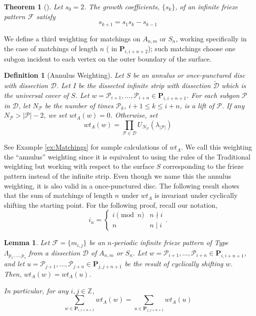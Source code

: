\documentclass[12pt]{article}
\newtheorem{definition}{Definition}
\newtheorem{theorem}{Theorem}
\newtheorem{lemma}{Lemma}
\theoremstyle{remark}
\newcommand*{\pathset}[2]{\mathbf{P}_{#1,#2}}
\newcommand*{\poly}[1]{\mathcal{P}_{#1}}
\newcommand*{\F}{\mathcal{F}}
\newcommand*{\D}{\mathcal{D}}
\begin{document}
\begin{theorem}[\cite{2}]\label{thm:GrowthCoefficientRecurrence}
Let $s_0 = 2$. The growth coefficients, $\{s_k\}$, of an infinite frieze pattern $\mathcal{F}$ satisfy \[
s_{k+1} = s_1s_{k} - s_{k-1}
\]
\end{theorem}

We define a third weighting for matchings on $A_{n,m}$ or $S_n$, working specifically in the case of matchings of length $n$ ( in $\pathset{i}{i+n+2}$); such matchings choose one subgon incident to each vertex on the outer boundary of the surface. 

\begin{definition}[Annulus Weighting]\label{def:AnnulusWeight}
Let $S$ be an annulus or once-punctured disc with dissection $\D$. Let $I$ be the dissected infinite strip with dissection $\widetilde{\D}$ which is the universal cover of $S$. Let $w = \poly{i+1},\ldots,\poly{i+n} \in \pathset{i}{i+n+1}$. For each subgon $\mathcal{P}$ in $\D$, let $N_{\mathcal{P}}$ be the number of times $\poly{k}$, $i+1 \leq k \leq i+n$, is a lift of $\mathcal{P}$.
 If any $N_{\mathcal{P}} > \vert \mathcal{P} \vert -2$, we set $wt_A(w) = 0$. Otherwise, set  \[
wt_A(w) = \prod_{\mathcal{P} \in \D} U_{N_\mathcal{P}}(\lambda_{\vert \mathcal{P} \vert})
\]
\end{definition}


See Example \ref{ex:Matchings} for sample calculations of $wt_A$. We call this weighting the ``annulus'' weighting since it is equivalent to using the rules of the Traditional weighting but working with respect to the surface $S$ corresponding to the frieze pattern instead of the infinite strip. Even though we name this the annulus weighting, it is also valid in a once-punctured disc. The following result shows that the sum of matchings of length $n$ under $wt_A$ is invariant under cyclically shifting the starting point. For the following proof, recall our notation, 
\[
 i_n = \begin{cases} i \pmod{n} & n \nmid i \\
 n & n \mid i \end{cases}.
 \]

\begin{lemma}\label{lem:AnnulusWeightInvariant}
Let $\F = \{m_{i,j}\}$ be an $n$-periodic infinite frieze pattern of Type $\Lambda_{p_1,\ldots,p_s}$ from a dissection $\D$ of $A_{n,m}$ or $S_n$. Let $w = \poly{i+1},\ldots,\poly{i+n} \in \pathset{i}{i+n+1}$, and let $u = \poly{j+1},\ldots,\poly{j+n} \in \pathset{j}{j+n+1}$ be the result of cyclically shifting $w$. Then, $wt_A(w) = wt_A(u)$.

In particular, for any $i,j \in \mathbb{Z}$, \[
\sum_{w \in \pathset{i}{i+n+1}} wt_A(w) = \sum_{u \in \pathset{j}{j+n+1}} wt_A(u)
\]
\end{lemma}
\end{document}
